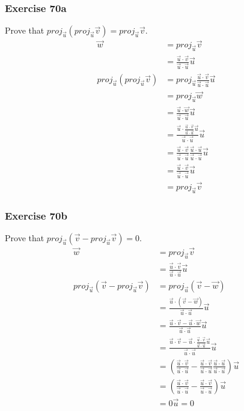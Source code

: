\documentclass{math}
\begin{document}
\subsubsection*{Exercise 70a}
Prove that \( proj_{\vec{u}}(proj_{\vec{u}}\vec{v}) = proj_{\vec{u}}\vec{v} \).
\begin{align*}
  \vec{w} &= proj_{\vec{u}}\vec{v} \\
  &= \frac{\vec{u}\cdot\vec{v}}{\vec{u}\cdot\vec{u}}\vec{u} \\
  proj_{\vec{u}}(proj_{\vec{u}}\vec{v}) &= proj_{\vec{u}}
    \frac{\vec{u}\cdot\vec{v}}{\vec{u}\cdot\vec{u}}\vec{u} \\
  &= proj_{\vec{u}}\vec{w} \\
  &= \frac{\vec{u}\cdot\vec{w}}{\vec{u}\cdot\vec{u}}\vec{u} \\
  &= \frac{\vec{u}\cdot\frac{\vec{u}\cdot\vec{v}}{\vec{u}\cdot\vec{u}}\vec{u}}
    {\vec{u}\cdot\vec{u}}\vec{u} \\
  &= \frac{\vec{u}\cdot\vec{v}}{\vec{u}\cdot\vec{u}}
    \frac{\vec{u}\cdot\vec{u}}{\vec{u}\cdot\vec{u}}\vec{u} \\
  &= \frac{\vec{u}\cdot\vec{v}}{\vec{u}\cdot\vec{u}}\vec{u} \\
  &= proj_{\vec{u}}\vec{v}
\end{align*}

\subsubsection*{Exercise 70b}
Prove that \( proj_{\vec{u}}(\vec{v}-proj_{\vec{u}}\vec{v}) = 0 \).
\begin{align*}
  \vec{w} &= proj_{\vec{u}}\vec{v} \\
  &= \frac{\vec{u}\cdot\vec{v}}{\vec{u}\cdot\vec{u}}\vec{u} \\
  proj_{\vec{u}}(\vec{v}-proj_{\vec{u}}\vec{v}) &=
    proj_{\vec{u}}(\vec{v}-\vec{w}) \\
  &= \frac{\vec{u}\cdot(\vec{v}-\vec{w})}{\vec{u}\cdot\vec{u}}\vec{u} \\
  &= \frac{\vec{u}\cdot\vec{v}-\vec{u}\cdot\vec{w}}
    {\vec{u}\cdot\vec{u}}\vec{u} \\
  &= \frac{\vec{u}\cdot\vec{v}-\vec{u}\cdot
    \frac{\vec{u}\cdot\vec{v}}{\vec{u}\cdot\vec{u}}\vec{u}}
    {\vec{u}\cdot\vec{u}}\vec{u} \\
  &= \left(\frac{\vec{u}\cdot\vec{v}}{\vec{u}\cdot\vec{u}}-
    \frac{\vec{u}\cdot\vec{v}}{\vec{u}\cdot\vec{u}}
    \frac{\vec{u}\cdot\vec{u}}{\vec{u}\cdot\vec{u}}\right)\vec{u} \\
  &= \left(\frac{\vec{u}\cdot\vec{v}}{\vec{u}\cdot\vec{u}}-
    \frac{\vec{u}\cdot\vec{v}}{\vec{u}\cdot\vec{u}}\right)\vec{u} \\
  &= 0\vec{u} = 0
\end{align*}
\end{document}
